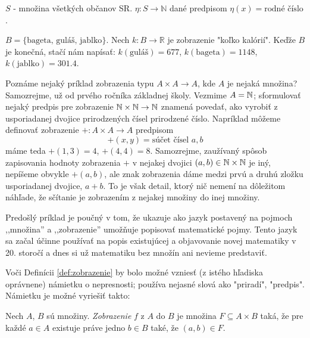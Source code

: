 \begin{example}
$S$ - množina všetkých občanov SR.
$\eta \colon S \rightarrow \mathbb{N}$ dané predpisom $\eta(x) = \text{rodné číslo}$.
\end{example}

\begin{example}
$B = \{\text{bageta, guláš, jablko}\}$. Nech $k \colon B \rightarrow \mathbb{R}$ je zobrazenie "koľko kalórií".
Keďže $B$ je konečná, stačí nám napísať:
$k(\text{guláš}) = 677$, $k(\text{bageta}) = 1148$, $k(\text{jablko}) = 301.4$.
\end{example}

\begin{example}
Poznáme nejaký príklad zobrazenia typu $A\times A\to A$, kde $A$ je nejaká množina? Samozrejme, už od prvého ročníka
základnej školy. Vezmime $A=\mathbb{N}$; sformulovať nejaký predpis pre zobrazenie 
$\mathbb{N}\times\mathbb{N}\to\mathbb{N}$ znamená povedať, ako vyrobiť z usporiadanej dvojice prirodzených čísel prirodzené
číslo. Napríklad môžeme definovať zobrazenie $+\colon A\times A\to A$ predpisom
\[
+(x,y)=\text{súčet čísel $a,b$}
\]
máme teda $+(1,3)=4$, $+(4,4)=8$. Samozrejme, zaužívaný spôsob zapisovania hodnoty zobrazenia $+$ v nejakej dvojici
$(a,b)\in\mathbb{N}\times\mathbb{N}$ je iný, nepíšeme obvykle $+(a,b)$, ale znak zobrazenia dáme medzi prvú a druhú zložku
usporiadanej dvojice, $a+b$. To je však detail, ktorý nič nemení na dôležitom náhľade, že sčítanie je zobrazením
z nejakej množiny do inej množiny.
\end{example}

Predošlý príklad je poučný v tom, že ukazuje ako jazyk postavený na pojmoch ,,množina'' a ,,zobrazenie'' umožňuje
popisovať matematické pojmy. Tento jazyk sa začal účinne používať na popis existujúcej a objavovanie novej matematiky v
20. storočí a dnes si už matematiku bez množín ani nevieme predstaviť.

Voči Definícii \ref{def:zobrazenie} by bolo možné vzniesť (z istého hľadiska oprávnene) námietku o nepresnosti; používa nejasné slová ako
"priradí", "predpis".
Námietku je možné vyriešiť takto:

\begin{definition}\label{def:zobrazenieFormal}
Nech $A$, $B$ sú množiny.
\emph{Zobrazenie} $f$ z $A$ do $B$ je množina $F \subseteq A \times B$ taká, že pre každé $a \in A$ existuje práve jedno $b \in B$ také, že $(a,b) \in F$.
\end{definition}

